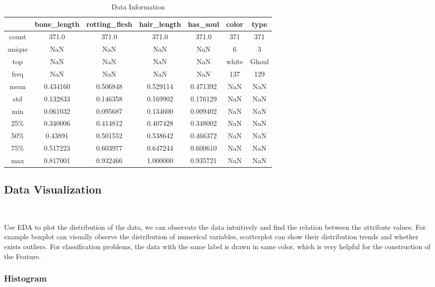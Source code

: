 \begin{table}[htbp]  \centering
	\caption{Data Information}
	\label{tbl:data information}
	\begin{tabular}{ccccccc}
		\hline
		& bone_length & rotting_flesh & hair_length & has_soul & color & type\\
		\hline
		count & 371.0 & 371.0 & 371.0 & 371.0 & 371 & 371 \\
		unique & NaN & NaN & NaN & NaN & 6 & 3 \\
		top & NaN & NaN & NaN & NaN & white & Ghoul \\
		freq & NaN & NaN & NaN & NaN & 137 & 129\\
		mean & 0.434160 & 0.506848 & 0.529114 & 0.471392 & NaN & NaN \\
		std & 0.132833 & 0.146358 & 0.169902 & 0.176129 & NaN & NaN \\
		min & 0.061032 & 0.095687 & 0.134600 & 0.009402 & NaN & NaN \\
		25\% & 0.340006 & 0.414812 & 0.407428 & 0.348002 & NaN & NaN \\
		50\% & 0.43891 & 0.501552 & 0.538642 & 0.466372 & NaN & NaN\\
		75\% & 0.517223 & 0.603977 & 0.647244 & 0.600610 & NaN & NaN\\
		max &  0.817001 & 0.932466 & 1.000000 & 0.935721 & NaN & NaN\\
		\hline 
	\end{tabular}
\end{table}


\subsection{Data Visualization}
\

Use EDA to plot the distribution of the data,
we can observate the data intuitively and
find the relation between the attribute values. 
For example boxplot can visually observe 
the distribution of numerical variables, 
scatterplot can show their distribution trends 
and whether exists outliers.
For classification problems, 
the data with the same label is drawn in same color, 
which is very helpful for 
the construction of the Feature.


\subsubsection{ Histogram}
\

